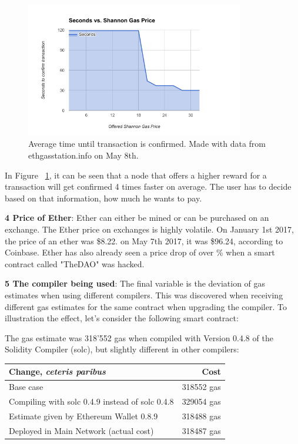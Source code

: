 \begin{figure}[H]
\centering
\includegraphics[width=0.85\textwidth]{gas-vs-transaction-time.png}
\caption{Average time until transaction is confirmed. Made with data from ethgasstation.info on May 8th.}
\label{fig:gas}
\end{figure}

In Figure ~\ref{fig:gas}, it can be seen that a node that offers a higher reward for a transaction will get confirmed 4 times faster on average. The user has to decide based on that information, how much he wants to pay.

\textbf{4 Price of Ether}: Ether can either be mined or can be purchased on an exchange. The Ether price on exchanges is highly volatile. On January 1st 2017, the price of an ether was \$8.22. on May 7th 2017, it was \$96.24, according to Coinbase. Ether has also already seen a price drop of over \% when a smart contract called "TheDAO" was hacked.

\textbf{5 The compiler being used}: The final variable is the deviation of gas estimates when using different compilers. This was discovered when receiving different gas estimates for the same contract when upgrading the compiler. To illustration the effect, let's consider the following smart contract:



The gas estimate was 318'552 gas when compiled with Version 0.4.8 of the Solidity Compiler (solc), but slightly different in other compilers:

\begin{center}
  \begin{tabular}{ l | r }
    \hline
    \textbf{Change, \textit{ceteris paribus}} & \textbf{Cost} \\ \hline
    Base case & 318552 gas \\ \hline
    Compiling with solc 0.4.9 instead of solc 0.4.8 & 329054 gas \\ \hline
    Estimate given by Ethereum Wallet 0.8.9 & 318488 gas \\ \hline
    Deployed in Main Network (actual cost) & 318487 gas \\
    \hline
  \end{tabular}
\end{center}

